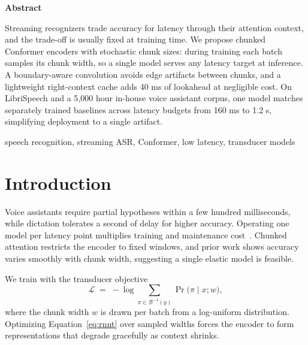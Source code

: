 \documentclass[10pt,twocolumn]{article}
\begin{document}
\thispagestyle{empty}

\begin{center}{\bfseries Abstract}\end{center}
\noindent Streaming recognizers trade accuracy for latency through their
attention context, and the trade-off is usually fixed at training time. We
propose chunked Conformer encoders with stochastic chunk sizes: during
training each batch samples its chunk width, so a single model serves any
latency target at inference. A boundary-aware convolution avoids edge
artifacts between chunks, and a lightweight right-context cache adds 40 ms
of lookahead at negligible cost. On LibriSpeech and a 5{,}000 hour in-house
voice assistant corpus, one model matches separately trained baselines
across latency budgets from 160 ms to 1.2 s, simplifying deployment to a
single artifact.

\vskip 6pt
 speech recognition, streaming ASR, Conformer, low latency, transducer models

\section{Introduction}
Voice assistants require partial hypotheses within a few hundred
milliseconds, while dictation tolerates a second of delay for higher
accuracy. Operating one model per latency point multiplies training and
maintenance cost~\cite{osullivan2023latency}. Chunked attention restricts
the encoder to fixed windows, and prior work shows accuracy varies smoothly
with chunk width, suggesting a single elastic model is feasible.

We train with the transducer objective
\begin{equation}
  \mathcal{L} \;=\; -\log \sum_{\pi \in \mathcal{B}^{-1}(y)} \Pr\bigl(\pi \mid x; w\bigr),
  \label{eq:rnnt}
\end{equation}
where the chunk width $w$ is drawn per batch from a log-uniform
distribution. Optimizing Equation~\eqref{eq:rnnt} over sampled widths
forces the encoder to form representations that degrade gracefully as
context shrinks.
\end{document}

